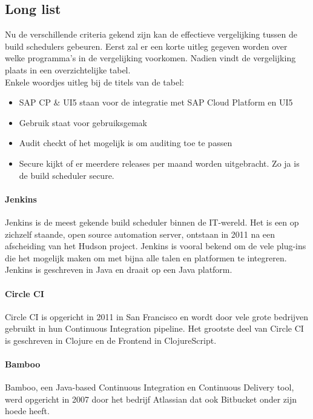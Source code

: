         \subsection{Long list}
        Nu de verschillende criteria gekend zijn kan de effectieve vergelijking tussen de build schedulers gebeuren.
        Eerst zal er een korte uitleg gegeven worden over welke programma's in de vergelijking voorkomen. Nadien vindt de vergelijking plaats in een overzichtelijke tabel.\\
        Enkele woordjes uitleg bij de titels van de tabel: 
        \begin{itemize}
            \item SAP CP \& UI5 staan voor de integratie met SAP Cloud Platform en UI5
            \item Gebruik staat voor gebruiksgemak
            \item Audit checkt of het mogelijk is om auditing toe te passen
            \item Secure kijkt of er meerdere releases per maand worden uitgebracht. Zo ja is de build scheduler secure.
        \end{itemize}
            
            \paragraph{Jenkins}
            Jenkins is de meest gekende build scheduler binnen de IT-wereld. Het is een op zichzelf staande, open source automation server, ontstaan in 2011 na een afscheiding van het Hudson project. Jenkins is vooral bekend om de vele plug-ins die het mogelijk maken om met bijna alle talen en platformen te integreren. Jenkins is geschreven in Java en draait op een Java platform.
            
            \paragraph{Circle CI}
            Circle CI is opgericht in 2011 in San Francisco en wordt door vele grote bedrijven gebruikt in hun Continuous Integration pipeline. Het grootste deel van Circle CI is geschreven in Clojure en de Frontend in ClojureScript. 

            \paragraph{Bamboo}
            Bamboo, een Java-based Continuous Integration en Continuous Delivery tool, werd opgericht in 2007 door het bedrijf Atlassian dat ook Bitbucket onder zijn hoede heeft.
            
